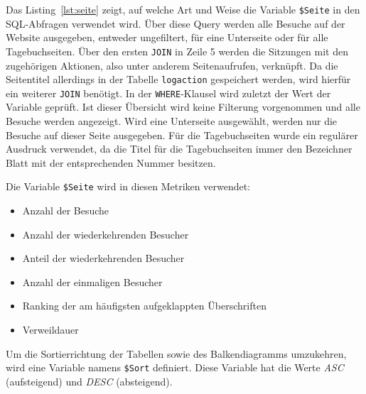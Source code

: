 Das Listing~\ref{lst:seite} zeigt, auf welche Art und Weise die Variable \texttt{\$Seite} in den SQL-Abfragen verwendet wird. Über diese Query werden alle Besuche auf der Website ausgegeben, entweder ungefiltert, für eine Unterseite oder für alle Tagebuchseiten. Über den ersten \texttt{JOIN} in Zeile 5 werden die Sitzungen mit den zugehörigen Aktionen, also unter anderem Seitenaufrufen, verknüpft. Da die Seitentitel allerdings in der Tabelle \texttt{log\textunderscore action} gespeichert werden, wird hierfür ein weiterer \texttt{JOIN} benötigt. In der {\texttt{WHERE}-Klausel} wird zuletzt der Wert der Variable geprüft. Ist dieser \glqq Übersicht\grqq{} wird keine Filterung vorgenommen und alle Besuche werden angezeigt. Wird eine Unterseite ausgewählt, werden nur die Besuche auf dieser Seite ausgegeben. Für die Tagebuchseiten wurde ein regulärer Ausdruck verwendet, da die Titel für die Tagebuchseiten immer den Bezeichner \glqq Blatt\grqq{} mit der entsprechenden Nummer besitzen.

Die Variable \texttt{\$Seite} wird in diesen Metriken verwendet: 
\begin{itemize}
    \item Anzahl der Besuche
    \item Anzahl der wiederkehrenden Besucher
    \item Anteil der wiederkehrenden Besucher
    \item Anzahl der einmaligen Besucher
    \item Ranking der am häufigsten aufgeklappten Überschriften
    \item Verweildauer
\end{itemize}

Um die Sortierrichtung der Tabellen sowie des Balkendiagramms umzukehren, wird eine Variable namens \texttt{\$Sort} definiert. Diese Variable hat die Werte \textit{ASC} (aufsteigend) und \textit{DESC} (absteigend).

\begin{figure}[H]
    \centering
    \begin{minipage}{\textwidth}
        
    \end{minipage}
\end{figure}

